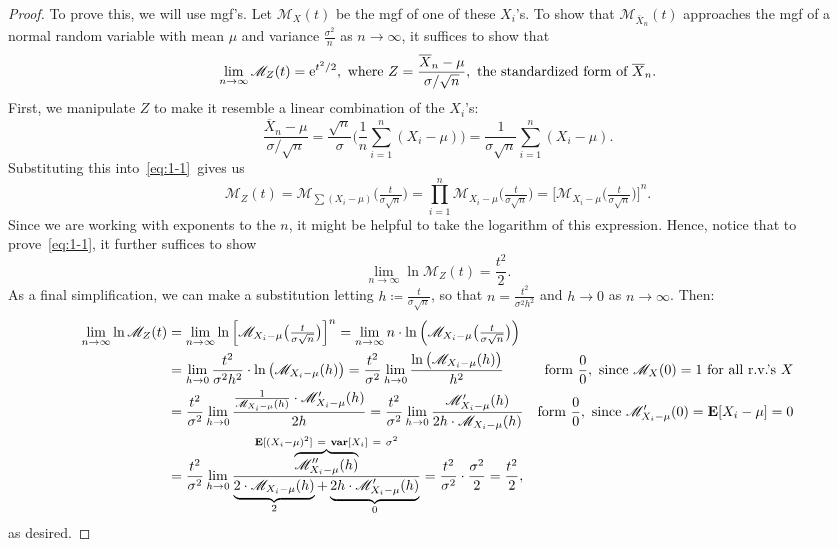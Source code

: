 \begin{proof}
    To prove this, we will use mgf's. 
    Let \(\mathscr{M}_{X}(t)\) be the mgf of one of these \(X_i\)'s. 
    To show that \(\mathscr{M}_{\overline{X}_n}(t) \) approaches the mgf of a normal random variable with mean \(\mu\) and variance \(\frac{\sigma^2}{n}\) as \(n\to\infty\), it suffices to show that\begin{equation}\label{eq:1-1}
        \lim_{n\to\infty} \mathscr{M}_Z(t) = \mathrm{e}^{t^2 / 2},~\text{where}~Z= \frac{\overline{X}_n - \mu}{\sigma / \sqrt{n}},~\text{the standardized form of}~\overline{X}_n. 
    \end{equation}
    First, we manipulate \(Z\) to make it resemble a linear combination of the \(X_i\)'s:\[
    \frac{\overline{X}_n - \mu}{\sigma / \sqrt{n}} = \frac{\sqrt{n}}{\sigma} \bigg(\frac{1}{n}\sum_{i=1}^n (X_i - \mu)\bigg) = \frac{1}{\sigma\sqrt{n}} \sum_{i=1}^n (X_i - \mu). 
    \]Substituting this into~\eqref{eq:1-1}~gives us\[
    \mathscr{M}_Z(t) = \mathscr{M}_{\sum (X_i - \mu)}\big(\tfrac{t}{\sigma \sqrt{n}}\big) = \prod_{i=1}^n \mathscr{M}_{X_i - \mu}\big(\tfrac{t}{\sigma\sqrt{n}}\big) = {\Big[\mathscr{M}_{X_i - \mu}\big(\tfrac{t}{\sigma\sqrt{n}}\big)\Big]}^n.\]
    Since we are working with exponents to the \(n\), it might be helpful to take the logarithm of this expression. 
    Hence, notice that to prove~\eqref{eq:1-1}, it further suffices to show\[
    \lim_{n\to\infty} \ln \mathscr{M}_Z(t) = \frac{t^2}{2}. 
    \]As a final simplification, we can make a substitution letting \(h\coloneq \frac{t}{\sigma\sqrt{n}}\), so that \(n = \frac{t^2}{\sigma^2 h^2}\) and \(h\to 0\) as \(n\to \infty\). 
    Then:\begin{align*}
    \lim_{n\to\infty} \ln \mathscr{M}_Z(t) &= \lim_{n\to\infty} \ln {\Big[\mathscr{M}_{X_i - \mu}\big(\tfrac{t}{\sigma\sqrt{n}}\big)\Big]}^n = \lim_{n\to\infty} n\cdot \ln \Big(\mathscr{M}_{X_i -\mu}\big(\tfrac{t}{\sigma\sqrt{n}}\big) \Big)\\
    &= \lim_{h\to 0} \frac{t^2}{\sigma^2 h^2} \cdot \ln \big(\mathscr{M}_{X_i - \mu}(h)\big) =\frac{t^2}{\sigma^2} \lim_{h\to 0} \frac{\ln\big(\mathscr{M}_{X_i - \mu}(h)\big)}{h^2} &\text{form}~\frac{0}{0},~\text{since}~\mathscr{M}_{X}(0) = 1~\text{for all r.v.'s}~X \\ 
    &=\frac{t^2}{\sigma^2}\lim_{h\to 0} \frac{\frac{1}{\mathscr{M}_{X_i -\mu}(h)} \cdot \mathscr{M}_{X_i - \mu}'(h)}{2h} = \frac{t^2}{\sigma^2} \lim_{h\to 0} \frac{\mathscr{M}_{X_i - \mu}'(h)}{2h\cdot \mathscr{M}_{X_i - \mu}(h)} &\text{form}~\frac{0}{0},~\text{since}~\mathscr{M}_{X_i -\mu}'(0) = \mathbf{E}[X_i - \mu] = 0 \\ 
    &=\frac{t^2}{\sigma^2}\lim_{h\to 0} \frac{\overbrace{\mathscr{M}_{X_i -\mu}''(h)}^{\mathbf{E}[{(X_i - \mu)}^2]~=~\mathbf{var} [X_i]~=~\sigma^2}}{\underbrace{2\cdot\mathscr{M}_{X_i -\mu}(h)}_2 + \underbrace{2h\cdot\mathscr{M}_{X_i -\mu}'(h)}_{0}} = \frac{t^2}{\sigma^2} \cdot \frac{\sigma^2}{2} = \frac{t^2}{2},
    \end{align*}as desired. 
\end{proof}


